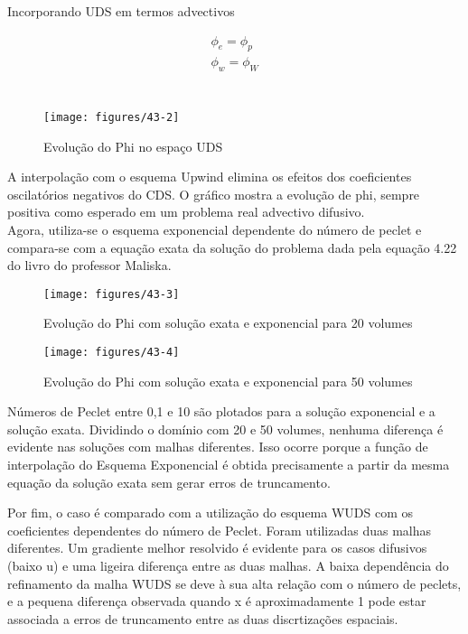 \documentclass[]{article}
\begin{document}
Incorporando UDS em termos advectivos

\begin{equation}
	\begin{aligned}
		\phi_e = \phi_p\\
		\phi_w = \phi_W\\
	\end{aligned}	
\end{equation}\\

\begin{figure}[H]
	\centering
	\texttt{[image: figures/43-2]}
	\caption{Evolução do Phi no espaço UDS}
\end{figure}

A interpolação com o esquema Upwind elimina os efeitos dos coeficientes oscilatórios negativos do CDS. O gráfico mostra a evolução de phi, sempre positiva como esperado em um problema real advectivo difusivo.\\

Agora, utiliza-se o esquema exponencial dependente do número de peclet e compara-se com a equação exata da solução do problema dada pela equação 4.22 do livro do professor Maliska.

\begin{figure}[H]
	\centering
	\texttt{[image: figures/43-3]}
	\caption{Evolução do Phi com solução exata e exponencial para 20 volumes}
\end{figure}
\begin{figure}[H]
	\centering
	\texttt{[image: figures/43-4]}
	\caption{Evolução do Phi com solução exata e exponencial para 50 volumes}
\end{figure}

Números de Peclet entre 0,1 e 10 são plotados para a solução exponencial e a solução exata. Dividindo o domínio com 20 e 50 volumes, nenhuma diferença é evidente nas soluções com malhas diferentes. Isso ocorre porque a função de interpolação do Esquema Exponencial é obtida precisamente a partir da mesma equação da solução exata sem gerar erros de truncamento.

Por fim, o caso é comparado com a utilização do esquema WUDS com os coeficientes dependentes do número de Peclet. Foram utilizadas duas malhas diferentes. Um gradiente melhor resolvido é evidente para os casos difusivos (baixo u) e uma ligeira diferença entre as duas malhas. A baixa dependência do refinamento da malha WUDS se deve à sua alta relação com o número de peclets, e a pequena diferença observada quando x é aproximadamente 1 pode estar associada a erros de truncamento entre as duas discrtizações espaciais.
\end{document}
